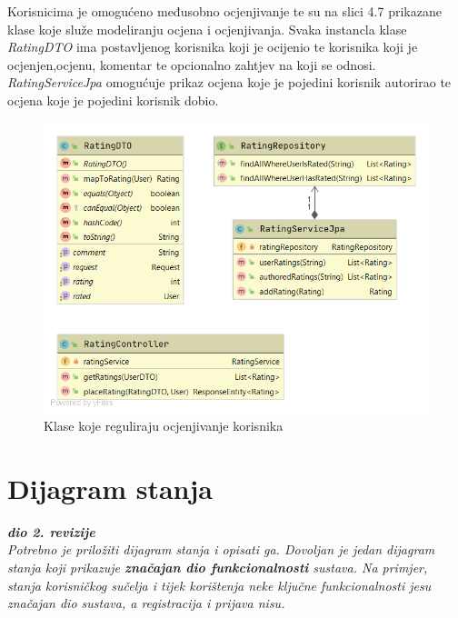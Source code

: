 				Korisnicima je omogućeno međusobno ocjenjivanje te su na slici 4.7 prikazane klase koje služe modeliranju ocjena i ocjenjivanja. Svaka instancla klase \textit{RatingDTO} ima postavljenog korisnika koji je ocijenio te korisnika koji je ocjenjen,ocjenu, komentar te opcionalno zahtjev na koji se odnosi.
				\textit{RatingServiceJpa} omogućuje prikaz ocjena koje je pojedini korisnik autorirao te ocjena koje je pojedini korisnik dobio.			
				\begin{figure}[H]
					\includegraphics[scale=0.6]{slike/cs5.png} %
					\centering
					\caption{Klase koje reguliraju ocjenjivanje korisnika}
					
				\end{figure}
				
				
			
				
			
			
				
		
			
			
			\eject
		
		\section{Dijagram stanja}
			
			
			\textbf{\textit{dio 2. revizije}}\\
			
			\textit{Potrebno je priložiti dijagram stanja i opisati ga. Dovoljan je jedan dijagram stanja koji prikazuje \textbf{značajan dio funkcionalnosti} sustava. Na primjer, stanja korisničkog sučelja i tijek korištenja neke ključne funkcionalnosti jesu značajan dio sustava, a registracija i prijava nisu. }
			
